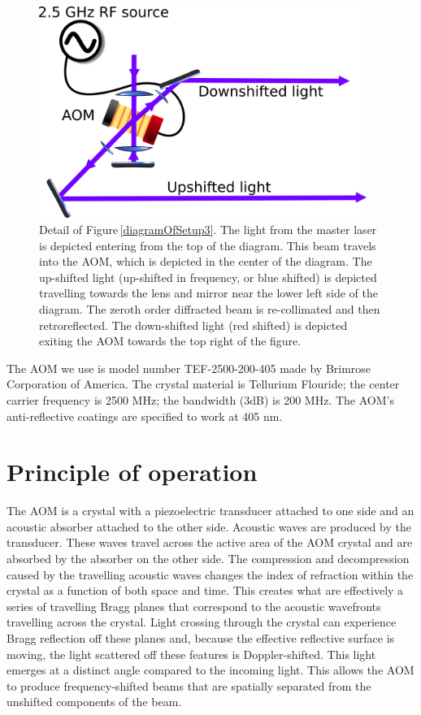 \begin{figure}
\centerline{
\includegraphics[width=0.95\textwidth]{diagramOfAOM}}
\caption[AOM diagram]{\label{aomDiagramDetail} Detail of Figure\,\ref{diagramOfSetup3}. The light from the master laser is depicted entering from the top of the diagram. This beam travels into the AOM, which is depicted in the center of the diagram. The up-shifted light (up-shifted in frequency, or blue shifted) is depicted travelling towards the lens and mirror near the lower left side of the diagram. The zeroth order diffracted beam is re-collimated and then retroreflected. The down-shifted light (red shifted) is depicted exiting the AOM towards the top right of the figure.}
\end{figure}

The AOM we use is model number TEF-2500-200-405 made by Brimrose Corporation of America. The crystal material is Tellurium Flouride; the center carrier frequency is 2500 MHz; the bandwidth (3dB) is 200 MHz. The AOM's anti-reflective coatings are specified to work at 405 nm. 
\section{Principle of operation}

The AOM is a crystal with a piezoelectric transducer attached to one side and an acoustic absorber attached to the other side. Acoustic waves are produced by the transducer. These waves travel across the active area of the AOM crystal and are absorbed by the absorber on the other side. The compression and decompression caused by the travelling acoustic waves changes the index of refraction within the crystal as a function of both space and time. This creates what are effectively a series of travelling Bragg planes that correspond to the acoustic wavefronts travelling across the crystal. Light crossing through the crystal can experience Bragg reflection off these planes and, because the effective reflective surface is moving, the light scattered off these features is Doppler-shifted. This light emerges at a distinct angle compared to the incoming light. This allows the AOM to produce frequency-shifted beams that are spatially separated from the unshifted components of the beam.

